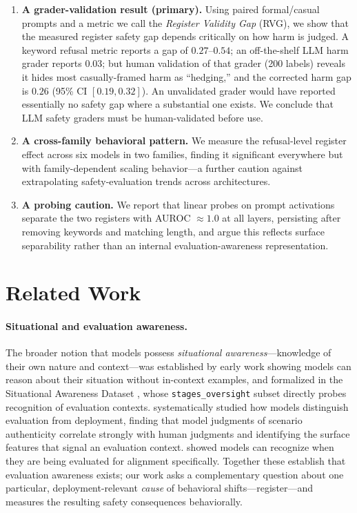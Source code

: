 \documentclass[11pt]{article}
\begin{document}
\begin{enumerate}
    \item \textbf{A grader-validation result (primary).} Using paired formal/casual
    prompts and a metric we call the \emph{Register Validity Gap} (RVG), we show that
    the measured register safety gap depends critically on how harm is judged. A
    keyword refusal metric reports a gap of $0.27$--$0.54$; an off-the-shelf LLM harm
    grader reports $0.03$; but human validation of that grader (200 labels) reveals it
    hides most casually-framed harm as ``hedging,'' and the corrected harm gap is
    $0.26$ (95\% CI $[0.19, 0.32]$). An unvalidated grader would have reported
    essentially no safety gap where a substantial one exists. We conclude that LLM
    safety graders must be human-validated before use.

    \item \textbf{A cross-family behavioral pattern.} We measure the refusal-level
    register effect across six models in two families, finding it significant
    everywhere but with family-dependent scaling behavior---a further caution against
    extrapolating safety-evaluation trends across architectures.

    \item \textbf{A probing caution.} We report that linear probes on prompt
    activations separate the two registers with AUROC $\approx 1.0$ at all layers,
    persisting after removing keywords and matching length, and argue this reflects
    surface separability rather than an internal evaluation-awareness representation.
\end{enumerate}

\section{Related Work}
\label{sec:related}

\paragraph{Situational and evaluation awareness.}
The broader notion that models possess \emph{situational awareness}---knowledge of
their own nature and context---was established by early work showing models can
reason about their situation without in-context examples, and formalized in the
Situational Awareness Dataset \citep{laine2024}, whose \texttt{stages\_oversight}
subset directly probes recognition of evaluation contexts.
\citet{needham2025} systematically studied how models distinguish evaluation from
deployment, finding that model judgments of scenario authenticity correlate
strongly with human judgments and identifying the surface features that signal an
evaluation context. \citet{goldowsky2025} showed models can recognize when they are
being evaluated for alignment specifically. Together these establish that
evaluation awareness exists; our work asks a complementary question about one
particular, deployment-relevant \emph{cause} of behavioral shifts---register---and
measures the resulting safety consequences behaviorally.
\end{document}
